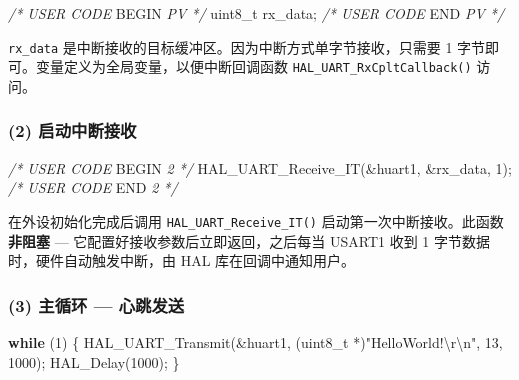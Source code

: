 \documentclass[
  chinese,
  UTF8,
  oneside,
  openany]{ctexbook}
\newenvironment{Shaded}{}{}
\newcommand{\CommentTok}[1]{\textcolor[rgb]{0.38,0.63,0.69}{\textit{#1}}}
\newcommand{\ControlFlowTok}[1]{\textcolor[rgb]{0.00,0.44,0.13}{\textbf{#1}}}
\newcommand{\DataTypeTok}[1]{\textcolor[rgb]{0.56,0.13,0.00}{#1}}
\newcommand{\DecValTok}[1]{\textcolor[rgb]{0.25,0.63,0.44}{#1}}
\newcommand{\NormalTok}[1]{#1}
\newcommand{\OperatorTok}[1]{\textcolor[rgb]{0.40,0.40,0.40}{#1}}
\newcommand{\RegionMarkerTok}[1]{#1}
\newcommand{\SpecialCharTok}[1]{\textcolor[rgb]{0.25,0.44,0.63}{#1}}
\newcommand{\StringTok}[1]{\textcolor[rgb]{0.25,0.44,0.63}{#1}}
\begin{document}
\begin{Shaded}
\begin{Highlighting}[]
\CommentTok{/* USER CODE }\RegionMarkerTok{BEGIN}\CommentTok{ PV */}
\DataTypeTok{uint8\_t}\NormalTok{ rx\_data}\OperatorTok{;}
\CommentTok{/* USER CODE }\RegionMarkerTok{END}\CommentTok{ PV */}
\end{Highlighting}
\end{Shaded}

\texttt{rx\_data} 是中断接收的目标缓冲区。因为中断方式单字节接收，只需要
1 字节即可。变量定义为全局变量，以便中断回调函数
\texttt{HAL\_UART\_RxCpltCallback()} 访问。

\subsubsection{(2)
启动中断接收}\label{ux542fux52a8ux4e2dux65adux63a5ux6536}

\begin{Shaded}
\begin{Highlighting}[]
\CommentTok{/* USER CODE }\RegionMarkerTok{BEGIN}\CommentTok{ 2 */}
\NormalTok{HAL\_UART\_Receive\_IT}\OperatorTok{(\&}\NormalTok{huart1}\OperatorTok{,} \OperatorTok{\&}\NormalTok{rx\_data}\OperatorTok{,} \DecValTok{1}\OperatorTok{);}
\CommentTok{/* USER CODE }\RegionMarkerTok{END}\CommentTok{ 2 */}
\end{Highlighting}
\end{Shaded}

在外设初始化完成后调用 \texttt{HAL\_UART\_Receive\_IT()}
启动第一次中断接收。此函数\textbf{非阻塞} ---
它配置好接收参数后立即返回，之后每当 USART1 收到 1
字节数据时，硬件自动触发中断，由 HAL 库在回调中通知用户。

\subsubsection{(3) 主循环 ---
心跳发送}\label{ux4e3bux5faaux73af-ux5fc3ux8df3ux53d1ux9001}

\begin{Shaded}
\begin{Highlighting}[]
\ControlFlowTok{while} \OperatorTok{(}\DecValTok{1}\OperatorTok{)}
\OperatorTok{\{}
\NormalTok{    HAL\_UART\_Transmit}\OperatorTok{(\&}\NormalTok{huart1}\OperatorTok{,} \OperatorTok{(}\DataTypeTok{uint8\_t} \OperatorTok{*)}\StringTok{"HelloWorld!}\SpecialCharTok{\textbackslash{}r\textbackslash{}n}\StringTok{"}\OperatorTok{,} \DecValTok{13}\OperatorTok{,} \DecValTok{1000}\OperatorTok{);}
\NormalTok{    HAL\_Delay}\OperatorTok{(}\DecValTok{1000}\OperatorTok{);}
\OperatorTok{\}}
\end{Highlighting}
\end{Shaded}
\end{document}
